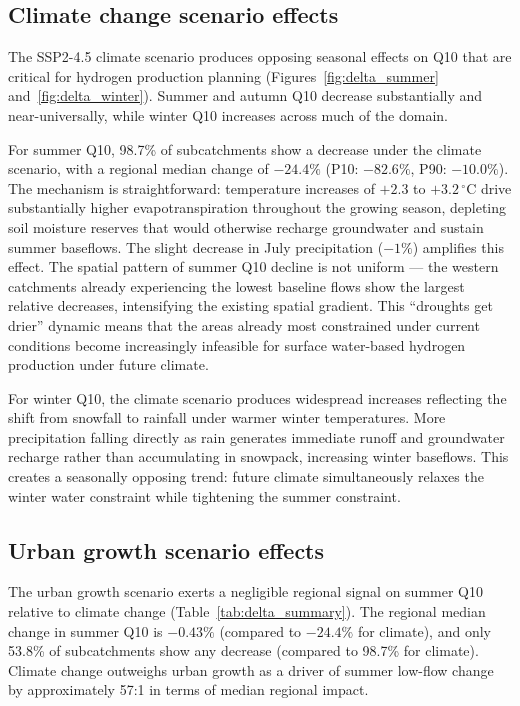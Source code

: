 \documentclass[draft]{agujournal2019}
\begin{document}
\subsection{Climate change scenario effects}

The SSP2-4.5 climate scenario produces opposing seasonal effects on Q10 that are critical for hydrogen production planning (Figures~\ref{fig:delta_summer} and~\ref{fig:delta_winter}). Summer and autumn Q10 decrease substantially and near-universally, while winter Q10 increases across much of the domain.

For summer Q10, 98.7\% of subcatchments show a decrease under the climate scenario, with a regional median change of $-24.4\%$ (P10: $-82.6\%$, P90: $-10.0\%$). The mechanism is straightforward: temperature increases of $+2.3$ to $+3.2\,^\circ$C drive substantially higher evapotranspiration throughout the growing season, depleting soil moisture reserves that would otherwise recharge groundwater and sustain summer baseflows. The slight decrease in July precipitation ($-1\%$) amplifies this effect. The spatial pattern of summer Q10 decline is not uniform — the western catchments already experiencing the lowest baseline flows show the largest relative decreases, intensifying the existing spatial gradient. This ``droughts get drier'' dynamic means that the areas already most constrained under current conditions become increasingly infeasible for surface water-based hydrogen production under future climate.

For winter Q10, the climate scenario produces widespread increases reflecting the shift from snowfall to rainfall under warmer winter temperatures. More precipitation falling directly as rain generates immediate runoff and groundwater recharge rather than accumulating in snowpack, increasing winter baseflows. This creates a seasonally opposing trend: future climate simultaneously relaxes the winter water constraint while tightening the summer constraint.

\subsection{Urban growth scenario effects}

The urban growth scenario exerts a negligible regional signal on summer Q10 relative to climate change (Table~\ref{tab:delta_summary}). The regional median change in summer Q10 is $-0.43\%$ (compared to $-24.4\%$ for climate), and only 53.8\% of subcatchments show any decrease (compared to 98.7\% for climate). Climate change outweighs urban growth as a driver of summer low-flow change by approximately 57:1 in terms of median regional impact.
\end{document}
